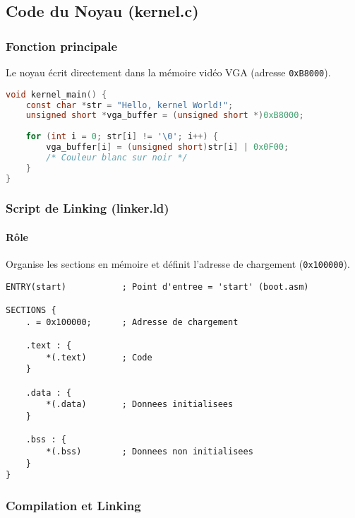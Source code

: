 \documentclass{article}
\begin{document}
\subsection*{Code du Noyau (kernel.c)}
\subsubsection*{Fonction principale}
Le noyau écrit directement dans la mémoire vidéo VGA (adresse \texttt{0xB8000}).

\begin{lstlisting}[language=C]
void kernel_main() {
    const char *str = "Hello, kernel World!";
    unsigned short *vga_buffer = (unsigned short *)0xB8000;
    
    for (int i = 0; str[i] != '\0'; i++) {
        vga_buffer[i] = (unsigned short)str[i] | 0x0F00; 
        /* Couleur blanc sur noir */
    }
}
\end{lstlisting}

\subsubsection*{Script de Linking (linker.ld)}
\paragraph{Rôle}
Organise les sections en mémoire et définit l'adresse de chargement (\texttt{0x100000}).

\begin{lstlisting}[language=ld]
ENTRY(start)           ; Point d'entree = 'start' (boot.asm)

SECTIONS {
    . = 0x100000;      ; Adresse de chargement

    .text : {
        *(.text)       ; Code
    }

    .data : {
        *(.data)       ; Donnees initialisees
    }

    .bss : {
        *(.bss)        ; Donnees non initialisees
    }
}
\end{lstlisting}

\subsubsection*{Compilation et Linking}
\end{document}
